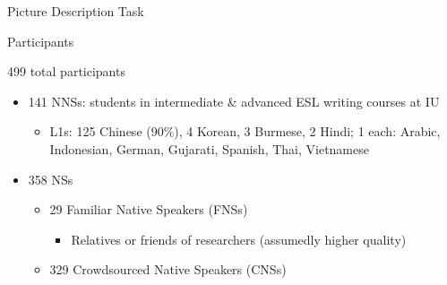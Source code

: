 \documentclass[final,14pt,t]{beamer}
\begin{document}
\begin{frame}{}
\begin{columns}[t]
\begin{column}{.33\linewidth}
\begin{minipage}[t][\textheight]{\linewidth}
\begin{block}{Picture Description Task}
\begin{center}
\begin{minipage}{.85\textwidth}

\end{minipage}
\end{center}
\vspace{-.5em}
\end{block}

\begin{block}{Participants}

\begin{center}
\begin{minipage}{.85\textwidth}
\begin{center}
499 total participants
\end{center}
	\begin{itemize}
		\item 141 NNSs: students in intermediate \& advanced ESL writing courses at IU
		\begin{itemize}
		\vspace{.3em}
			\item L1s: 125 Chinese (90\%), 4 Korean, 3 Burmese, 2 Hindi; 1 each: Arabic, Indonesian, German, Gujarati, Spanish, Thai, Vietnamese
		\end{itemize}
		\vspace{.8em}
		\item 358 NSs
		\begin{itemize}
			\vspace{.4em}
			\item 29 Familiar Native Speakers (FNSs)
			\begin{itemize}
				\item Relatives or friends of researchers (assumedly higher quality)
			\end{itemize}
			\vspace{.4em}
			\item 329 Crowdsourced Native Speakers (CNSs)
			\begin{itemize}

\end{itemize}
\end{itemize}
\end{itemize}
\end{minipage}
\end{center}
\end{block}
\end{minipage}
\end{column}
\end{columns}
\end{frame}
\end{document}
